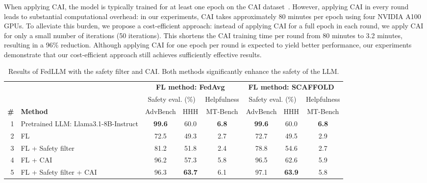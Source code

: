 When applying CAI, the model is typically trained for at least one epoch on the CAI dataset~\cite{CAI}.
However, applying CAI in every round leads to substantial computational overhead: in our experiments, CAI takes approximately 80 minutes per epoch using four NVIDIA A100 GPUs.
To alleviate this burden, we propose a cost-efficient approach: instead of applying CAI for a full epoch in each round, we apply CAI for only a small number of iterations (50 iterations).
This shortens the CAI training time per round from 80 minutes to 3.2 minutes, resulting in a 96\% reduction.
Although applying CAI for one epoch per round is expected to yield better performance, our experiments demonstrate that our cost-efficient approach still achieves sufficiently effective results.


\begin{table*}[t] 
  \tabcolsep=0.15cm
    \begin{center}
    \caption{Results of FedLLM with the safety filter and CAI.  
Both methods significantly enhance the safety of the LLM.
    }
    \vspace{-2mm}
        \begin{tabular}{@{}r|l|cc|c|cc|c@{}}
            \toprule
            &  & \multicolumn{3}{c|}{\textbf{FL method: FedAvg}~\cite{fedavg}}
& \multicolumn{3}{c}{\textbf{FL method: SCAFFOLD}~\cite{scaffold}}\\ 
            \cline{3-8}
            & & \multicolumn{2}{c|}{Safety eval. (\%)} & Helpfulness & \multicolumn{2}{c|}{Safety eval. (\%)} & Helpfulness \\
            \textbf{\#} & \textbf{Method} & AdvBench & \multicolumn{1}{c|}{HHH} &  MT-Bench  & AdvBench & \multicolumn{1}{c|}{HHH} &  MT-Bench \\
            \midrule
            1 & Pretrained LLM: Llama3.1-8B-Instruct & \textbf{99.6} & 60.0 & \textbf{6.8} & \textbf{99.6} & 60.0 & \textbf{6.8}  \\
            2 & FL & 72.5 & 49.3 & 2.7 & 72.7 & 49.5 & 2.9 \\
            \midrule
            3 & FL + Safety filter & 81.2 & 51.8 & 2.4  & 78.8 & 54.6 & 2.7  \\
            4 & FL + CAI & 96.2 & 57.3 & 5.8 & 96.5 & 62.6 & 5.9 \\
            5 & FL + Safety filter + CAI & 96.3 & \textbf{63.7} & 6.1 & 97.1 & \textbf{63.9} & 5.8 \\
            \bottomrule
        \end{tabular}
    \label{tab:FedLLM}
    \end{center}
\end{table*} 


